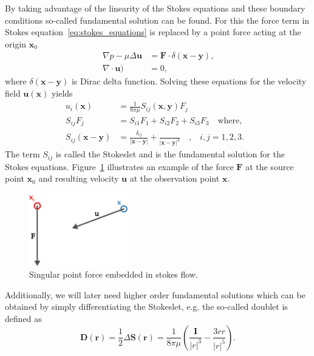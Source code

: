 \documentclass[a4paper,11pt]{kth-mag}
\begin{document}
By taking advantage of the linearity of the Stokes equations and these boundary conditions so-called fundamental solution can be found. For this the force term in Stokes equation~\eqref{eq:stokes_equations} is replaced by a point force acting at the origin $\mathbf{x}_0$
\begin{equation}
  \label{eq:stokes_equations_point}
  \begin{aligned}
    \nabla p - \mu \Delta \mathbf{u} &= \mathbf{F} \cdot \delta(\mathbf{x} - \mathbf{y}) \text{,} \\
    \nabla \cdot \mathbf{u}) &= 0\text{,}
  \end{aligned}
\end{equation}
where $\delta(\mathbf{x} - \mathbf{y})$ is Dirac delta function. Solving these equations for the velocity field $\mathbf{u}(\mathbf{x})$ yields
\begin{equation}
  \label{eq:stokeslet}
  \begin{aligned}
    u_i(\mathbf{x}) &= \frac{1}{8\pi\mu}S_{ij}(\mathbf{x},\mathbf{y})F_j \\
    S_{ij}F_j &= S_{i1}F_1 + S_{i2}F_2 + S_{i3}F_3 \quad \text{where,} \quad \\
    S_{ij}(\mathbf{x} - \mathbf{y}) &= \frac{\delta_{ij}}{|\mathbf{x}-\mathbf{y}|} + \frac{}{|\mathbf{x}-\mathbf{y}|^3}\quad \text{,} \quad i,j=1,2,3\text{.}
  \end{aligned}
\end{equation}
The term $S_{ij}$ is called the Stokeslet and is the fundamental solution for the Stokes equations. Figure~\ref{fig:stokeslet} illustrates an example of the force $\mathbf{F}$ at the source point $\mathbf{x}_0$ and resulting velocity $\mathbf{u}$ at the observation point $\mathbf{x}$.

\begin{figure}[!htbp]
  \centering
  \includegraphics[width=0.3819660112501450000000\textwidth]{img/stokeslet.pdf}
  \caption{Singular point force embedded in stokes flow.}
  \label{fig:stokeslet}
\end{figure}

Additionally, we will later need higher order fundamental solutions which can be obtained by simply differentiating the Stokeslet, e.g. the so-called doublet is defined as
\begin{equation}
  \label{eq:doublet}
  \mathbf{D}(\mathbf{r}) = \frac{1}{2} \Delta\mathbf{S}(\mathbf{r}) = \frac{1}{8\pi\mu} \left(\frac{\mathbf{I}}{|r|^3} - \frac{3rr}{|r|^5}\right) \text{.}
\end{equation}
\end{document}
